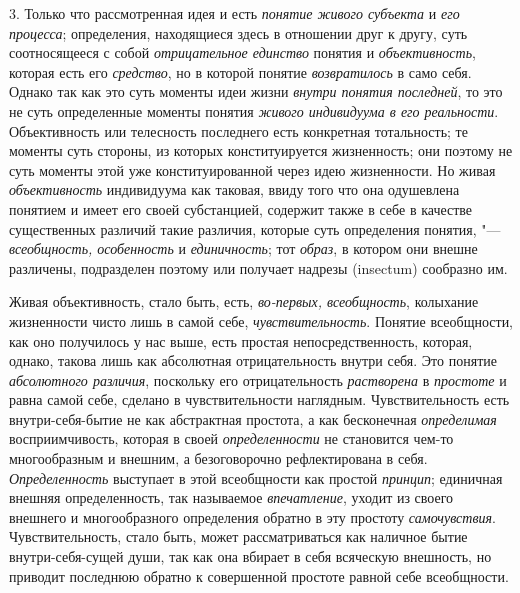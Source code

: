 {{3. Только что рассмотренная идея и есть
{\em понятие живого субъекта}
и {\em его процесса};
определения, находящиеся здесь в отношении друг к другу, суть
соотносящееся с собой {\em отрицательное
единство} понятия и
{\em объективность},
которая есть его
{\em средство}, но в
которой понятие {\em возвратилось}
в само себя. Однако так как это суть моменты идеи жизни
{\em внутри понятия последней},
то это не суть определенные моменты понятия
{\em живого индивидуума в его
реальности}. Объективность или телесность последнего есть
конкретная тотальность; те моменты суть стороны, из которых конституируется
жизненность; они поэтому не суть моменты этой уже конституированной через
идею жизненности. Но живая
{\em объективность}
индивидуума как таковая, ввиду того что она одушевлена
понятием и имеет его своей субстанцией, содержит также в себе в качестве
существенных различий такие различия, которые суть определения понятия, "---
{\em всеобщность, особенность
}и {\em единичность};
тот {\em образ},
в котором они внешне различены, подразделен поэтому или
получает надрезы (insectum) сообразно
им.

Живая объективность, стало быть, есть,
{\em во-первых, всеобщность},
колыхание жизненности чисто лишь в самой себе,
{\em чувствительность}.
Понятие всеобщности, как оно получилось у нас выше, есть
простая непосредственность, которая, однако, такова лишь как абсолютная
отрицательность внутри себя. Это понятие
{\em абсолютного различия},
поскольку его отрицательность
{\em растворена} в
{\em простоте} и равна
самой себе, сделано в чувствительности наглядным. Чувствительность есть
внутри-себя-бытие не как абстрактная простота, а как бесконечная
{\em определимая}
восприимчивость, которая в своей
{\em определенности} не
становится чем-то многообразным и внешним, а безоговорочно рефлектирована в
себя. {\em Определенность}
выступает в этой всеобщности как простой
{\em принцип}; единичная
внешняя определенность, так называемое
{\em впечатление}, уходит
из своего внешнего и многообразного определения обратно в
эту простоту {\em самочувствия}.
Чувствительность, стало быть, может рассматриваться как
наличное бытие внутри-себя-сущей души, так как она вбирает в себя всяческую
внешность, но приводит последнюю обратно к совершенной простоте равной себе
всеобщности.

}}
